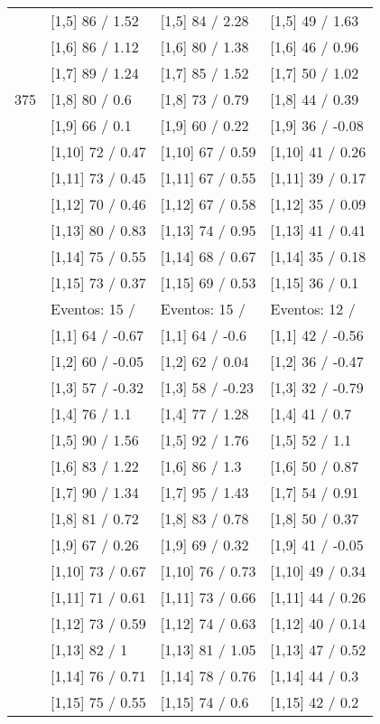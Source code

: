 \begin{table}
\begin{tabular}[t]{llll}
 & {}[1,5] 86  / 1.52 & {}[1,5] 84  / 2.28 & {}[1,5] 49  / 1.63\\
 & {}[1,6] 86  / 1.12 & {}[1,6] 80  / 1.38 & {}[1,6] 46  / 0.96\\
 & {}[1,7] 89  / 1.24 & {}[1,7] 85  / 1.52 & {}[1,7] 50  / 1.02\\
375 & {}[1,8] 80  / 0.6 & {}[1,8] 73  / 0.79 & {}[1,8] 44  / 0.39\\
\addlinespace
 & {}[1,9] 66  / 0.1 & {}[1,9] 60  / 0.22 & {}[1,9] 36  / -0.08\\
 & {}[1,10] 72  / 0.47 & {}[1,10] 67  / 0.59 & {}[1,10] 41  / 0.26\\
 & {}[1,11] 73  / 0.45 & {}[1,11] 67  / 0.55 & {}[1,11] 39  / 0.17\\
 & {}[1,12] 70  / 0.46 & {}[1,12] 67  / 0.58 & {}[1,12] 35  / 0.09\\
 & {}[1,13] 80  / 0.83 & {}[1,13] 74  / 0.95 & {}[1,13] 41  / 0.41\\
\addlinespace
 & {}[1,14] 75  / 0.55 & {}[1,14] 68  / 0.67 & {}[1,14] 35  / 0.18\\
 & {}[1,15] 73  / 0.37 & {}[1,15] 69  / 0.53 & {}[1,15] 36  / 0.1\\
 & Eventos:  15 / & Eventos:  15 / & Eventos:  12 /\\
 & {}[1,1] 64  / -0.67 & {}[1,1] 64  / -0.6 & {}[1,1] 42  / -0.56\\
 & {}[1,2] 60  / -0.05 & {}[1,2] 62  / 0.04 & {}[1,2] 36  / -0.47\\
\addlinespace
 & {}[1,3] 57  / -0.32 & {}[1,3] 58  / -0.23 & {}[1,3] 32  / -0.79\\
 & {}[1,4] 76  / 1.1 & {}[1,4] 77  / 1.28 & {}[1,4] 41  / 0.7\\
 & {}[1,5] 90  / 1.56 & {}[1,5] 92  / 1.76 & {}[1,5] 52  / 1.1\\
 & {}[1,6] 83  / 1.22 & {}[1,6] 86  / 1.3 & {}[1,6] 50  / 0.87\\
 & {}[1,7] 90  / 1.34 & {}[1,7] 95  / 1.43 & {}[1,7] 54  / 0.91\\
\addlinespace
500 & {}[1,8] 81  / 0.72 & {}[1,8] 83  / 0.78 & {}[1,8] 50  / 0.37\\
 & {}[1,9] 67  / 0.26 & {}[1,9] 69  / 0.32 & {}[1,9] 41  / -0.05\\
 & {}[1,10] 73  / 0.67 & {}[1,10] 76  / 0.73 & {}[1,10] 49  / 0.34\\
 & {}[1,11] 71  / 0.61 & {}[1,11] 73  / 0.66 & {}[1,11] 44  / 0.26\\
 & {}[1,12] 73  / 0.59 & {}[1,12] 74  / 0.63 & {}[1,12] 40  / 0.14\\
\addlinespace
 & {}[1,13] 82  / 1 & {}[1,13] 81  / 1.05 & {}[1,13] 47  / 0.52\\
 & {}[1,14] 76  / 0.71 & {}[1,14] 78  / 0.76 & {}[1,14] 44  / 0.3\\
 & {}[1,15] 75  / 0.55 & {}[1,15] 74  / 0.6 & {}[1,15] 42  / 0.2\\
\bottomrule
\end{tabular}
\end{table}
